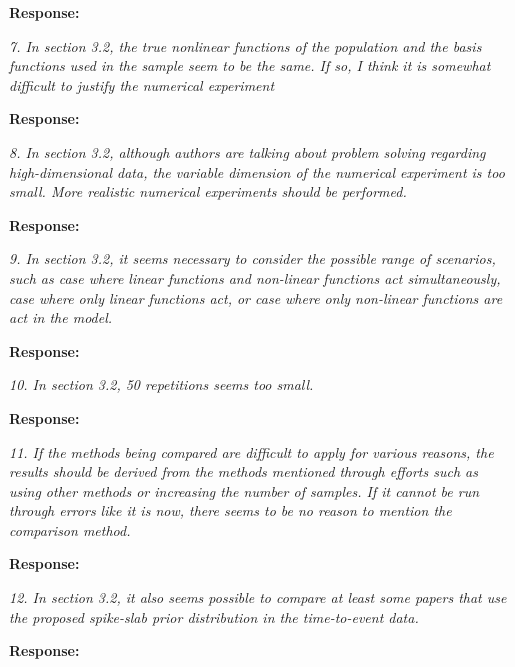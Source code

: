 \documentclass[11pt]{article}
\begin{document}
\medskip

\textbf{Response:} 

\bigskip

{\em 7. In section 3.2, the true nonlinear functions of the population and the basis functions used in the sample seem to be the same. If so, I think it is somewhat difficult to justify the numerical experiment}

\medskip

\textbf{Response:} 

\bigskip


{\em 8. In section 3.2, although authors are talking about problem solving regarding high-dimensional data, the variable dimension of the numerical experiment is too small. More realistic numerical experiments should be performed.}

\medskip

\textbf{Response:} 

\bigskip


{\em 9. In section 3.2, it seems necessary to consider the possible range of scenarios, such as case where linear functions and non-linear functions act simultaneously, case where only linear functions act, or case where only non-linear functions are act in the model.}

\medskip

\textbf{Response:} 

\bigskip


{\em 10. In section 3.2, 50 repetitions seems too small.}

\medskip

\textbf{Response:} 

\bigskip

{\em 11. If the methods being compared are difficult to apply for various reasons, the results should be derived from the methods mentioned through efforts such as using other methods or increasing the number of samples. If it cannot be run through errors like it is now, there seems to be no reason to mention the comparison method.}

\medskip

\textbf{Response:} 

\bigskip

{\em 12. In section 3.2, it also seems possible to compare at least some papers that use the proposed spike-slab prior distribution in the time-to-event data.}

\medskip

\textbf{Response:} 

\bigskip
\end{document}
